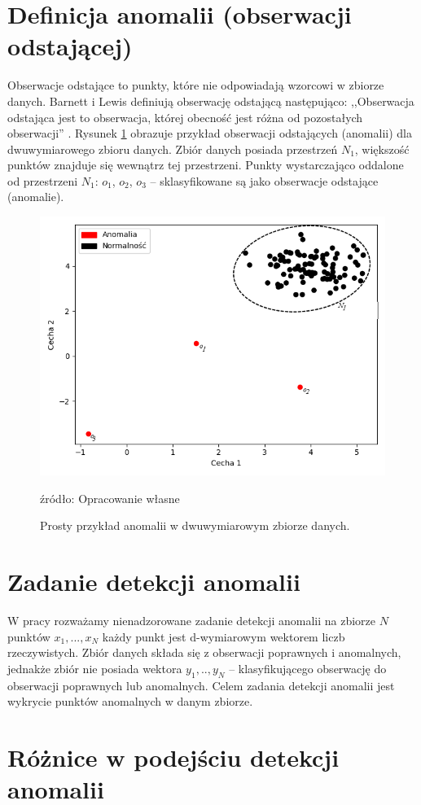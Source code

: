 \section{Definicja anomalii (obserwacji odstającej)}
Obserwacje odstające to punkty, które nie odpowiadają wzorcowi w zbiorze danych. Barnett i Lewis definiują obserwację odstającą następująco: ,,Obserwacja odstająca jest to obserwacja, której obecność jest różna od pozostałych obserwacji'' \cite{barnett1984outliers}. Rysunek \ref{fig:anomalia} obrazuje przykład obserwacji odstających (anomalii) dla dwuwymiarowego zbioru danych. Zbiór danych posiada przestrzeń {$N_1$}, większość punktów znajduje się wewnątrz tej przestrzeni. Punkty wystarczająco oddalone od przestrzeni $N_1$: $o_1$, $o_2$, $o_3$ -- sklasyfikowane są jako obserwacje odstające (anomalie).
\begin{figure}[h]
    \centering
    \includegraphics[width=.7\textwidth]{chapters/istniejace/images/anomalia.png}
    \caption{Prosty przykład anomalii w dwuwymiarowym zbiorze danych.}
    \footnotesize{źródło: Opracowanie własne}
    \label{fig:anomalia}
\end{figure}

\section{Zadanie detekcji anomalii}
W pracy rozważamy nienadzorowane zadanie detekcji anomalii na zbiorze $N$ punktów $x_1,...,x_N$ każdy punkt jest d-wymiarowym wektorem liczb rzeczywistych. Zbiór danych składa się z obserwacji poprawnych i anomalnych, jednakże zbiór nie posiada wektora $y_1,..,y_N$ -- klasyfikującego obserwację do obserwacji poprawnych lub anomalnych. Celem zadania detekcji anomalii jest wykrycie punktów anomalnych w danym zbiorze.

\section{Różnice w podejściu detekcji anomalii}

